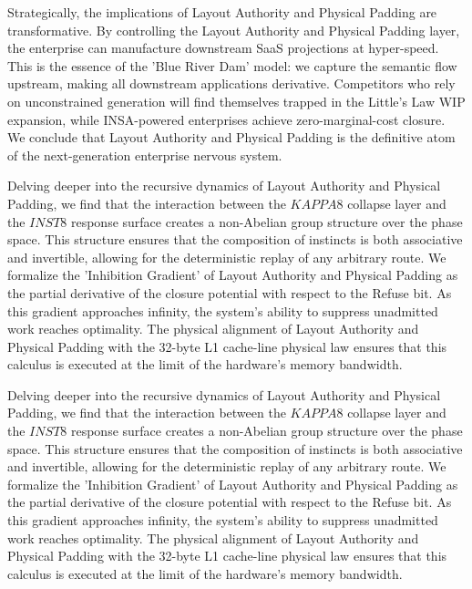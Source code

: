 \documentclass[12pt,a4paper,oneside]{book}
\begin{document}
Strategically, the implications of Layout Authority and Physical Padding are transformative. By controlling the Layout Authority and Physical Padding layer, the enterprise can manufacture downstream SaaS projections at hyper-speed. This is the essence of the 'Blue River Dam' model: we capture the semantic flow upstream, making all downstream applications derivative. Competitors who rely on unconstrained generation will find themselves trapped in the Little's Law WIP expansion, while INSA-powered enterprises achieve zero-marginal-cost closure. We conclude that Layout Authority and Physical Padding is the definitive atom of the next-generation enterprise nervous system. 

Delving deeper into the recursive dynamics of Layout Authority and Physical Padding, we find that the interaction between the $KAPPA8$ collapse layer and the $INST8$ response surface creates a non-Abelian group structure over the phase space. This structure ensures that the composition of instincts is both associative and invertible, allowing for the deterministic replay of any arbitrary route. We formalize the 'Inhibition Gradient' of Layout Authority and Physical Padding as the partial derivative of the closure potential with respect to the Refuse bit. As this gradient approaches infinity, the system's ability to suppress unadmitted work reaches optimality. The physical alignment of Layout Authority and Physical Padding with the 32-byte L1 cache-line physical law ensures that this calculus is executed at the limit of the hardware's memory bandwidth. 

Delving deeper into the recursive dynamics of Layout Authority and Physical Padding, we find that the interaction between the $KAPPA8$ collapse layer and the $INST8$ response surface creates a non-Abelian group structure over the phase space. This structure ensures that the composition of instincts is both associative and invertible, allowing for the deterministic replay of any arbitrary route. We formalize the 'Inhibition Gradient' of Layout Authority and Physical Padding as the partial derivative of the closure potential with respect to the Refuse bit. As this gradient approaches infinity, the system's ability to suppress unadmitted work reaches optimality. The physical alignment of Layout Authority and Physical Padding with the 32-byte L1 cache-line physical law ensures that this calculus is executed at the limit of the hardware's memory bandwidth. 
\end{document}
